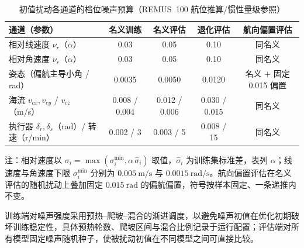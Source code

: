 \begin{table}[htbp]
  \centering
  \caption{初值扰动各通道的档位噪声预算（REMUS~100 航位推算/惯性量级参照）}
  \label{tab:noise-budget}
  \small
  \begin{tabularx}{\textwidth}{>{\raggedright\arraybackslash}X cccc}
    \toprule
    通道（参数） & 名义训练 & 名义评估 & 退化评估 & 航向偏置评估 \\
    \midrule
    相对线速度 \(\nu_r\)（\(\alpha\)）& 0.03 & 0.05 & 0.10 & 同名义 \\
    相对角速度 \(\nu_r\)（\(\alpha\)）& 0.03 & 0.05 & 0.10 & 同名义 \\
    姿态（偏航主导小角 / rad）& 0.0035 & 0.0050 & 0.0120 & 名义 \(+\) 固定 0.015 偏置 \\
    海流 \(v_{cx},v_{cy}\) / \(v_{cz}\)（m/s）& 0.008 / 0.004 & 0.012 / 0.006 & 0.030 / 0.015 & 同名义 \\
    执行器 \(\delta_r,\delta_s\)（rad）/ 转速（r/min）& 0.002 / 3 & 0.003 / 5 & 0.008 / 15 & 同名义 \\
    \bottomrule
  \end{tabularx}
  \par\vspace{2pt}
  \footnotesize 注：相对速度以 \(\sigma_i=\max(\sigma_i^{\min},\alpha\,\hat\sigma_i)\) 取值，\(\hat\sigma_i\) 为训练集标准差，表列 \(\alpha\)；线速度与角速度下限 \(\sigma_i^{\min}\) 分别为 \(0.005~\mathrm{m/s}\) 与 \(0.0015~\mathrm{rad/s}\)。航向偏置评估在名义评估的随机扰动上叠加固定 \(0.015~\mathrm{rad}\) 的偏航偏置，符号按样本固定、一条递推内不变。
\end{table}

训练端对噪声强度采用预热--爬坡--混合的渐进调度，以避免噪声初值在优化初期破坏训练稳定性，具体预热轮数、爬坡区间与混合比例记录于运行配置；评估端对所有模型固定噪声随机种子，使被扰动初值在不同模型之间可直接比较。
